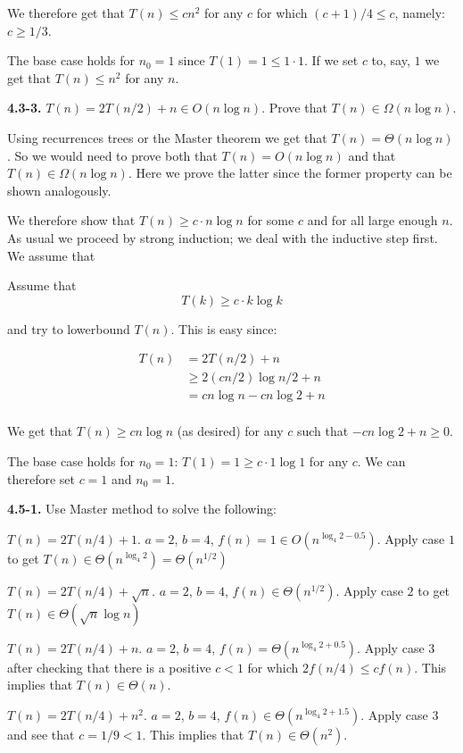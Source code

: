 \documentclass{article}
\newcommand{\Oh}{O}
\renewcommand{\leq}{\leqslant}
\renewcommand{\geq}{\geqslant}
\begin{document}
We therefore get that $T(n) \leq cn^2$ for any $c$ for which $(c+1)/4 \leq c$, namely: $c \geq 1/3$. 

The base case holds for $n_0=1$ since $T(1) = 1 \leq 1 \cdot 1$. If we set $c$ to, say, $1$ we get that $T(n) \leq n^2$ for any $n$.


\noindent\textbf{4.3-3.} $T(n) = 2T(n / 2) + n \in O(n \log{n})$. Prove that $T(n) \in \Omega(n \log{n})$.

Using recurrences trees or the Master theorem we get that $T(n) = \Theta(n \log n)$. So we would need to prove both that $T(n) = \Oh(n \log n)$ and that $T(n) \in \Omega(n \log n)$. Here we prove the latter since the former property can be shown analogously.

We therefore show that $T(n) \geq c \cdot n \log n$ for some $c$ and for all large enough $n$. As usual we proceed by strong induction; we deal with the inductive step first. We assume that

Assume that
\begin{equation*}
\label{eq-third}
T(k) \geq c \cdot k \log{k}
\end{equation*}

and try to lowerbound $T(n)$. This is easy since:

\begin{equation*}
\label{eq-v2}
\begin{split}
	T(n) &= 2T(n/2) + n \\
		& \geq 2 (cn/2) \log{n/2} + n \\
		&= cn\log{n} - cn\log{2} + n \\
\end{split}
\end{equation*}

We get that $T(n) \geq cn \log n$ (as desired) for any $c$ such that $-cn \log 2 + n \geq 0$.

The base case holds for $n_0 = 1$: $T(1) = 1 \geq c \cdot 1 \log{1}$ for any $c$. We can therefore set $c = 1$ and $n_0 = 1$.

\noindent\textbf{4.5-1.} Use Master method to solve the following:

\begin{description} \itemsep8pt
	\item $T(n) = 2T(n/4) + 1$. $a = 2$, $b=4$, $f(n) = 1 \in O(n^{\log_4 2 - 0.5})$. Apply case $1$ to get $T(n) \in \Theta(n^{\log_4{2}}) = \Theta(n^{1/2})$

	\item $T(n) = 2T(n/4) + \sqrt{n}$. $a=2$, $b=4$, $f(n) \in \Theta(n^{1/2})$. Apply case $2$ to get $T(n) \in \Theta(\sqrt{n}\log{n})$

	\item $T(n) = 2T(n/4) + n$. $a = 2$, $b=4$, $f(n) = \Theta(n^{\log_4 2 + 0.5})$. Apply case $3$ after checking that there is a positive $c < 1$ for which $2f(n/4) \leq cf(n)$. This implies that $T(n) \in \Theta(n)$.

	\item $T(n) = 2T(n/4) + n^2$. $a=2$, $b=4$, $f(n) \in \Theta(n^{\log_4 2 + 1.5})$. Apply case $3$ and see that $c=1/9 < 1$. This implies that $T(n) \in \Theta(n^2)$.

\end{description}
\end{document}
